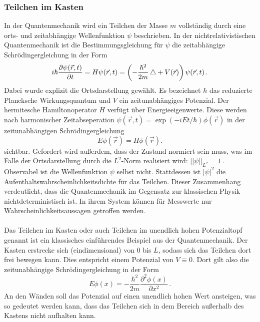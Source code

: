 \subsubsection{Teilchen im Kasten}
\label{subsubsec:kasten}
In der Quantenmechanik wird ein Teilchen der Masse $m$ vollständig durch eine orts- und zeitabhängige Wellenfunktion $\psi$ beschrieben. In der nichtrelativistischen Quantenmechanik ist die Bestimmungsgleichung für $\psi$ die zeitabhängige Schrödingergleichung in der Form
\begin{equation}
  i \hbar \frac{\partial \psi(\vec{r},t)}{\partial t} = H \psi(\vec{r},t) = \left(- \frac{\hbar^2}{2 m} \mathop{}\!\mathbin\bigtriangleup + V(\vec{r})\right) \psi(\vec{r},t)\,.
  \label{eqn:schroedingerZeitabhaengig}
\end{equation}
Dabei wurde explizit die Ortsdarstellung gewählt. Es bezeichnet $\hbar$ das reduzierte Plancksche Wirkungsquantum und $V$ ein zeitunabhängiges Potenzial. Der hermitesche Hamiltonoperator $H$ verfügt über Energieeigenwerte. Diese werden nach harmonischer Zeitabseperation $\psi(\vec{r},t) = \exp(-i E t / \hbar) \phi(\vec{r})$ in der zeitunabhängigen Schrödingergleichung
\begin{equation}
  E \phi(\vec{r}) = H \phi(\vec{r}).
  \label{eqn:schroedingerZeitunabhaengig}
\end{equation}
sichtbar. Gefordert wird außerdem, dass der Zustand normiert sein muss, was im Falle der Ortsdarstellung durch die $L^2$-Norm realisiert wird: $\lvert\lvert \psi \rvert\rvert_{L^2} = 1\,.$ Observabel ist die Wellenfunktion $\psi$ selbst nicht. Stattdessen ist $\lvert \psi \rvert ^2$ die Aufenthaltswahrscheinlichkeitsdichte für das Teilchen. Dieser Zusammenhang verdeutlicht, dass die Quantenmechanik im Gegensatz zur klassischen Physik nichtdeterministisch ist. In ihrem System können für Messwerte nur Wahrscheinlichkeitsaussagen getroffen werden.
\\\\
Das Teilchen im Kasten oder auch Teilchen im unendlich hohen Potenzialtopf genannt ist ein klassisches einführendes Beispiel aus der Quantenmechanik. Der Kasten erstrecke sich (eindimensional) von 0 bis $L$, sodass sich das Teilchen dort frei bewegen kann. Dies entspricht einem Potenzial von $V \equiv 0$. Dort gilt also die zeitunabhängige Schrödingergleichung in der Form
\begin{equation}
  E \phi(x) = - \frac{\hbar^2}{2 m}  \frac{\partial^2 \phi(x)} {\partial x^2} \,.
  \label{eqn:schroedingerKasten}
\end{equation}
An den Wänden soll das Potenzial auf einen unendlich hohen Wert ansteigen, was so gedeutet werden kann, dass das Teilchen sich in dem Bereich außerhalb des Kastens nicht aufhalten kann.\\
